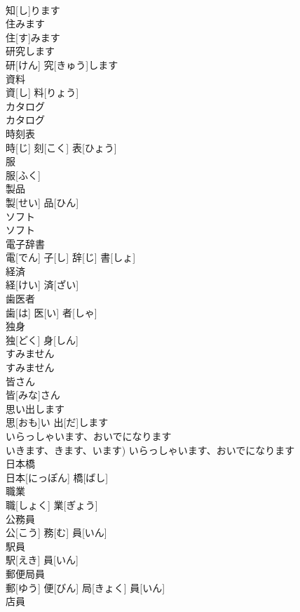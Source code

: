 \documentclass[8pt]{extreport}
\begin{document}
\begin{CJK}{UTF8}{min}
\\	知[し]ります		
\\	住みます	
\\	住[す]みます		
\\	研究します	
\\	研[けん] 究[きゅう]します		
\\	資料	
\\	資[し] 料[りょう]		
\\	カタログ	
\\	カタログ		
\\	時刻表	
\\	時[じ] 刻[こく] 表[ひょう]		
\\	服	
\\	服[ふく]		
\\	製品	
\\	製[せい] 品[ひん]		
\\	ソフト	
\\	ソフト		
\\	電子辞書	
\\	電[でん] 子[し] 辞[じ] 書[しょ]		
\\	経済	
\\	経[けい] 済[ざい]		
\\	歯医者	
\\	歯[は] 医[い] 者[しゃ]		
\\	独身	
\\	独[どく] 身[しん]		
\\	すみません	
\\	すみません		
\\	皆さん	
\\	皆[みな]さん		
\\	思い出します	
\\	思[おも]い 出[だ]します		
\\	いらっしゃいます、おいでになります	
\\	いきます、きます、います)	いらっしゃいます、おいでになります		
\\	日本橋	
\\	日本[にっぽん] 橋[ばし]		
\\	職業	
\\	職[しょく] 業[ぎょう]		
\\	公務員	
\\	公[こう] 務[む] 員[いん]		
\\	駅員	
\\	駅[えき] 員[いん]		
\\	郵便局員	
\\	郵[ゆう] 便[びん] 局[きょく] 員[いん]		
\\	店員	

\end{CJK}
\end{document}
